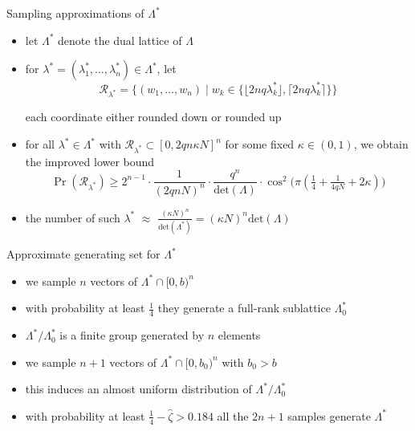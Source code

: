 \documentclass[slideColor]{prosper}
\renewcommand{\>}{\rangle}
\newcommand{\<}{\langle}
\begin{document}

\begin{slide}{Sampling approximations of $\Lambda^*$}

\vspace{-0.3cm}
\begin{itemize}
\item let $\Lambda^*$ denote the dual lattice of $\Lambda$

\medskip
\item for $\lambda^*=(\lambda^*_1,\ldots,\lambda^*_n)\in\Lambda^*$, let
\[
\mathcal{R}_{\lambda^*} = \big\{
(w_1,\ldots,w_n) \mid w_k \in \{ \lfloor 2nq \lambda_k^* \rfloor, \lceil 2nq \lambda_k^* \rceil \} 
\big\}
\]

\quad each coordinate either rounded down or rounded up 

\bigskip
\item for all $\lambda^*\in\Lambda^*$ with $\mathcal{R}_{\lambda^*}\subset[0,2qn\kappa N]^n$ for some fixed $\kappa\in(0,1)$, we obtain the improved lower bound
\[
\Pr(\mathcal{R_{\lambda^*}} ) \ge 2^{n-1} \cdot \frac{1}{(2qnN)^n} \cdot \frac{q^n}{\mathrm{det}(\Lambda)} \cdot \cos^2\big( \pi (\tfrac{1}{4} + \tfrac{1}{4qN} + 2\kappa) \big) 
\]

\medskip
\item the number of such $\lambda^*$ $\approx$ $\tfrac{(\kappa N)^n}{\mathrm{det}(\Lambda^*)} = (\kappa N)^n \mathrm{det}(\Lambda)$

\end{itemize}

\end{slide}


\begin{slide}{Approximate generating set for $\Lambda^*$}
\begin{itemize}
\item we sample $n$ vectors of $\Lambda^* \cap [0,b)^n$ 

\medskip
\item with probability at least $\tfrac{1}{4}$ they generate a full-rank sublattice $\Lambda^*_0$

\medskip
\item $\Lambda^*/\Lambda^*_0$ is a finite group generated by $n$ elements

\medskip
\item we sample $n+1$ vectors of $\Lambda^* \cap [0,b_0)^n$ with $b_0 > b$

\medskip
\item this induces an almost uniform distribution of $\Lambda^*/\Lambda^*_0$

\medskip
\item with probability at least $\frac{1}{4}-\hat{\zeta}>0.184$ all the $2n+1$ samples generate $\Lambda^*$ 

\end{itemize}

\end{slide}
\end{document}
